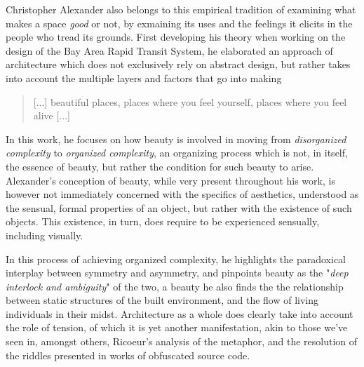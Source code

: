 


Christopher Alexander also belongs to this empirical tradition of examining what makes a space \emph{good} or not, by exmaining its uses and the feelings it elicits in the people who tread its grounds. First developing his theory when working on the design of the Bay Area Rapid Transit System, he elaborated an approach of architecture which does not exclusively rely on abstract design, but rather takes into account the multiple layers and factors that go into making 

\begin{quote}
  [...] beautiful places, places where you feel yourself, places where you feel alive \citep{alexander_timeless_1979} [...]
\end{quote}

In this work, he focuses on how beauty is involved in moving from \emph{disorganized complexity} to \emph{organized complexity}, an organizing process which is not, in itself, the essence of beauty, but rather the condition for such beauty to arise. Alexander's conception of beauty, while very present throughout his work, is however not immediately concerned with the specifics of aesthetics, understood as the sensual, formal properties of an object, but rather with the existence of such objects. This existence, in turn, does require to be experienced sensually, including visually.

In this process of achieving organized complexity, he highlights the paradoxical interplay between symmetry and asymmetry, and pinpoints beauty as the "\emph{deep interlock and ambiguity}" of the two, a beauty he also finds the the relationship between static structures of the built environment, and the flow of living individuals in their midst. Architecture as a whole does clearly take into account the role of tension, of which it is yet another manifestation, akin to those we've seen in, amongst others, Ricoeur's analysis of the metaphor, and the resolution of the riddles presented in works of obfuscated source code.

